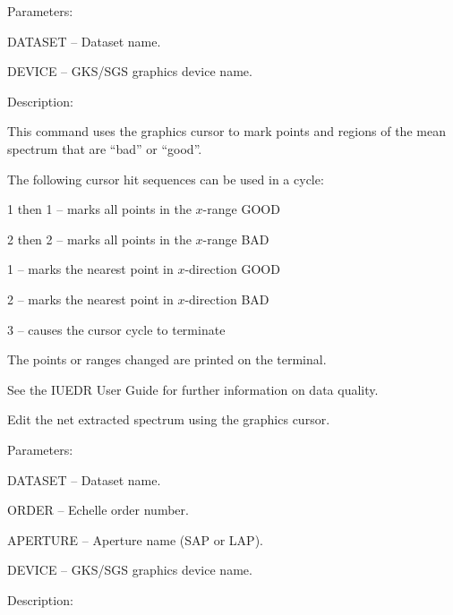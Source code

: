 \begin {description}
\begin {description}
\item Parameters:

\begin {description}
\item DATASET -- Dataset name.
\item DEVICE -- GKS/SGS graphics device name.
\end {description}

\item Description:

This command uses the graphics cursor to mark points and
regions of the mean spectrum that are ``bad'' or ``good''.

The following cursor hit sequences can be used in a cycle:

\begin {description}
\item 1 then 1 -- marks all points in the $x$-range GOOD
\item 2 then 2 -- marks all points in the $x$-range BAD
\item 1 -- marks the nearest point in $x$-direction GOOD
\item 2 -- marks the nearest point in $x$-direction BAD
\item 3 -- causes the cursor cycle to terminate
\end {description}

The points or ranges changed are printed on the terminal.

See the IUEDR User Guide for further information on data quality.
\end {description}

\item [EDSPEC]
Edit the net extracted spectrum using the graphics cursor.

\begin {description}
\item Parameters:

\begin {description}
\item DATASET -- Dataset name.
\item ORDER -- Echelle order number.
\item APERTURE -- Aperture name (SAP or LAP).
\item DEVICE -- GKS/SGS graphics device name.
\end {description}

\item Description:


\end{description}
\end{description}

